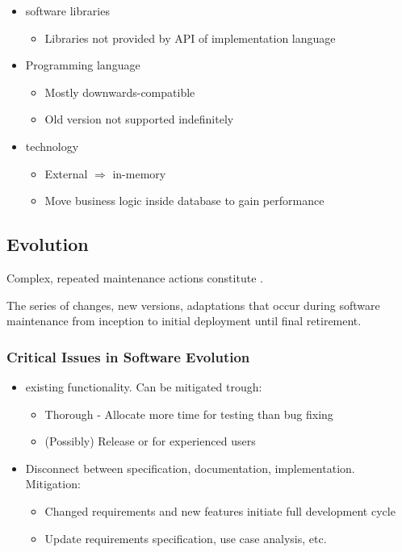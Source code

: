 \documentclass[
    ../../Software_Engineering_Summary.tex,
]
{subfiles}
\begin{document}
\begin{defbox}
	\begin{itemize}
    \item {} software libraries
    \begin{itemize}
        \item Libraries not provided by API of implementation language
    \end{itemize}
    \item Programming language
    \begin{itemize}
        \item Mostly downwards-compatible
        \item Old version not supported indefinitely
    \end{itemize}
    \item {} technology
    \begin{itemize}
        \item External $\Rightarrow$ in-memory
        \item Move business logic inside database to gain performance
    \end{itemize}
\end{itemize}
\end{defbox}

\newpage
\subsection{Evolution}
Complex, repeated maintenance actions constitute .

\begin{defbox}
    The series of changes, new versions, adaptations that occur during software maintenance from inception to initial deployment until final retirement.
\end{defbox}

\subsubsection{Critical Issues in Software Evolution}
\begin{itemize}
    \item {} existing functionality. Can be mitigated trough:
    \begin{itemize}
        \item Thorough  - Allocate more time for testing than bug fixing
        \item (Possibly) Release  or  for experienced users 
    \end{itemize}
    \item Disconnect between specification, documentation, implementation. Mitigation:
    \begin{itemize}
        \item Changed requirements and new features initiate full development cycle
        \item Update requirements specification, use case analysis, etc.
    \end{itemize}
\end{itemize}
\end{document}
